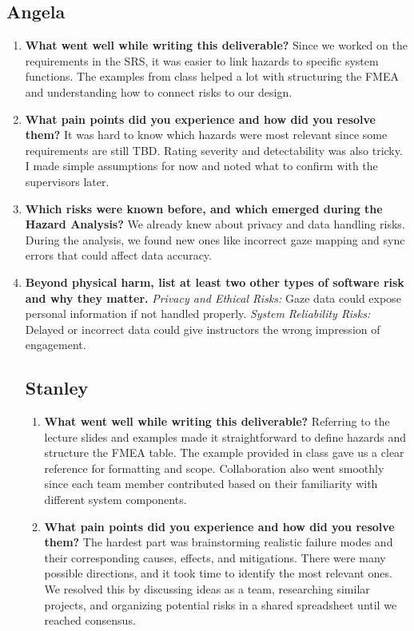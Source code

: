 \documentclass{article}
\begin{document}
\subsection*{Angela}
\begin{enumerate}
    \item \textbf{What went well while writing this deliverable?}  
    Since we worked on the requirements in the SRS, it was easier to link hazards to specific system functions. The examples from class helped a lot with structuring the FMEA and understanding how to connect risks to our design.

    \item \textbf{What pain points did you experience and how did you resolve them?}  
    It was hard to know which hazards were most relevant since some requirements are still TBD. Rating severity and detectability was also tricky. I made simple assumptions for now and noted what to confirm with the supervisors later.

    \item \textbf{Which risks were known before, and which emerged during the Hazard Analysis?}  
    We already knew about privacy and data handling risks. During the analysis, we found new ones like incorrect gaze mapping and sync errors that could affect data accuracy.

    \item \textbf{Beyond physical harm, list at least two other types of software risk and why they matter.}  
    \textit{Privacy and Ethical Risks:} Gaze data could expose personal information if not handled properly.
    \textit{System Reliability Risks:} Delayed or incorrect data could give instructors the wrong impression of engagement.

\subsection*{Stanley}
\begin{enumerate}
    \item \textbf{What went well while writing this deliverable?}  
    Referring to the lecture slides and examples made it straightforward to define hazards and structure the FMEA table. The example provided in class gave us a clear reference for formatting and scope. Collaboration also went smoothly since each team member contributed based on their familiarity with different system components.

    \item \textbf{What pain points did you experience and how did you resolve them?}  
    The hardest part was brainstorming realistic failure modes and their corresponding causes, effects, and mitigations. There were many possible directions, and it took time to identify the most relevant ones. We resolved this by discussing ideas as a team, researching similar projects, and organizing potential risks in a shared spreadsheet until we reached consensus.


\end{enumerate}
\end{enumerate}
\end{document}
